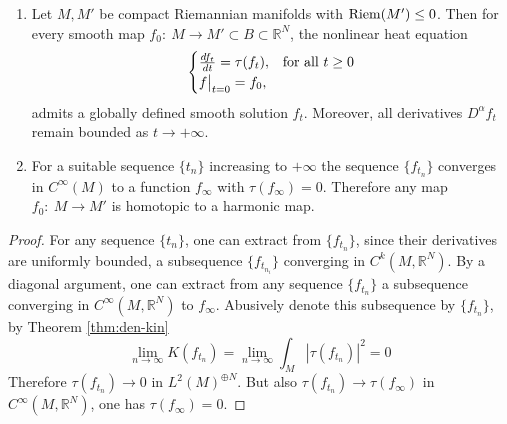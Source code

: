 \begin{theorem}
\label{thm:final}
\begin{enumerate}
\item Let \(M, M'\) be compact Riemannian manifolds with \(\mathop{\rm Riem}\nolimits(M') \leq 0\). Then for
every smooth map \(f_0:\ M \longrightarrow M'\subset B\subset \mathbb{R}^N\), the
nonlinear heat equation
\begin{equation*}
\begin{cases}
\frac{df_t}{dt} = \tau(f_t),  & \text{for all $t\geq 0$} \\
\restr{f}{t=0} = f_0,
\end{cases}      
\end{equation*}
admits a globally defined smooth solution \(f_t\). Moreover, all derivatives \(D^\alpha
   f_t\) remain bounded as \(t\to +\infty\).
\item For a suitable sequence \(\{t_n\}\) increasing to \(+\infty\) the sequence \(\{f_{t_n}\}\) converges in \(C^\infty(M)\) to a function \(f_\infty\) with \(\tau(f_\infty)=0\). Therefore any map \(f_0:\ M \longrightarrow M'\) is homotopic to a harmonic map.
\end{enumerate}
\end{theorem}
\begin{proof}
For any sequence \(\{t_n\}\), one can extract from \(\{f_{t_n}\}\), since their derivatives are
uniformly bounded, a subsequence \(\{f_{t_{n_i}}\}\) converging in \(C^k(M,
\mathbb{R}^N)\). By a diagonal argument, one can extract from any sequence \(\{f_{t_n}\}\) a subsequence converging in \(C^\infty(M, \mathbb{R}^N)\) to \(f_\infty\). Abusively denote this subsequence by \(\{f_{t_n}\}\), by Theorem \ref{thm:den-kin}
\[
 \lim_{n\to\infty} K(f_{t_n}) = \lim_{n\to\infty} \int_M |\tau(f_{t_n})|^2 = 0
\]
Therefore \(\tau(f_{t_n}) \to 0\) in \(L^2(M)^{\oplus N}\). But also \(\tau(f_{t_n})
\to \tau(f_\infty)\) in \(C^\infty(M, \mathbb{R}^N)\), one has \(\tau(f_\infty)=0\).
\end{proof}

